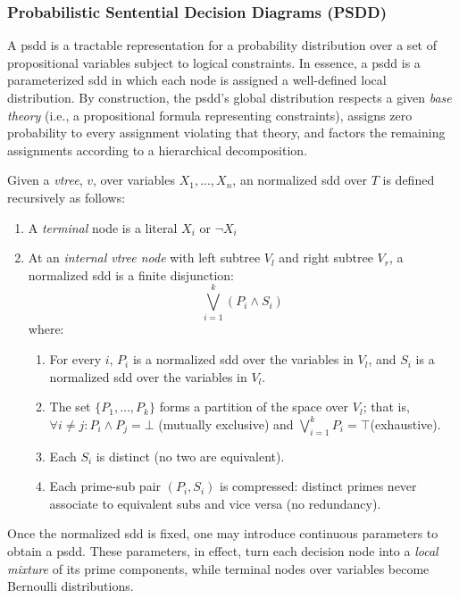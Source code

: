 \subsubsection{Probabilistic Sentential Decision Diagrams (PSDD)}
\label{sec:psdd}

A \acrfull{psdd} is a tractable representation for a probability distribution over a set of propositional variables subject to logical constraints.  In essence, a \acrshort{psdd} is a parameterized \acrfull{sdd} in which each node is assigned a well-defined local distribution.  By construction, the \acrshort{psdd}'s global distribution respects a given \emph{base theory} (i.e., a propositional formula representing constraints), assigns zero probability to every assignment violating that theory, and factors the remaining assignments according to a hierarchical decomposition.

\begin{definition}
Given a \emph{vtree}, $v$, over variables ${X_1, ... , X_n}$, an normalized \acrshort{sdd} over $T$ is defined recursively as follows:
\begin{enumerate}
    \item A \emph{terminal} node is a literal $X_i$ or $\neg X_i$
\item At an \emph{internal vtree node} with left subtree $V_l$ and right subtree $V_r$, a normalized \acrshort{sdd} is a finite disjunction: $$\bigvee_{i=1}^k \left( P_i \land S_i \right)$$ where:
\begin{enumerate}
    \item For every $i$,  $P_i$ is a normalized \acrshort{sdd} over the variables in $V_l$, and $S_i$ is a normalized \acrshort{sdd} over the variables in $V_l$.
    \item The set $\{P_1, \ldots, P_k\}$ forms a partition of the space over $V_l$; that is, $\forall i \neq j: P_i \land P_j = \bot$ (mutually exclusive) and $\bigvee_{i=1}^k P_i = \top$(exhaustive).
    \item Each $S_i$ is distinct (no two are equivalent).
    \item Each prime-sub pair $(P_i, S_i)$ is compressed: distinct primes never associate to equivalent subs and vice versa (no redundancy).
\end{enumerate}

\end{enumerate}
\end{definition}

Once the normalized \acrshort{sdd} is fixed, one may introduce continuous parameters to obtain a \acrshort{psdd}. These parameters, in effect, turn each decision node into a \emph{local mixture} of its prime components, while terminal nodes over variables become Bernoulli distributions.

